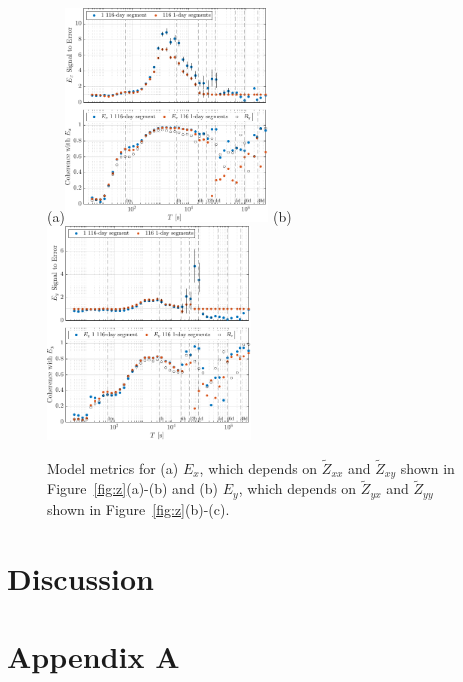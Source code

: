 \documentclass[draft,linenumbers]{agujournal2018}
\begin{document}
\begin{figure}[h!]
  \subfigure(a){\includegraphics[width=0.48\textwidth]{figures/snplot-Middelpos-tf1;Middelpos-tf3-E_x.pdf}} 
  \subfigure(b){\includegraphics[width=0.48\textwidth]{figures/snplot-Middelpos-tf1;Middelpos-tf3-E_y.pdf}} 

  \caption{Model metrics for (a) $E_x$, which depends on $\widetilde{Z}_{xx}$ and $\widetilde{Z}_{xy}$ shown in Figure~\ref{fig:z}(a)-(b) and (b) $E_y$, which depends on $\widetilde{Z}_{yx}$ and $\widetilde{Z}_{yy}$ shown in  Figure~\ref{fig:z}(b)-(c).}
  \label{fig:se}

\end{figure}


\clearpage

\section{Discussion}

\section{Appendix A}
\end{document}
